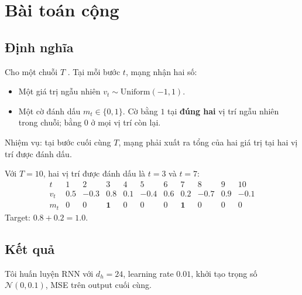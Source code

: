 %

\section{Bài toán cộng}
\label{sec:ch02-adding}

%

\subsection{Định nghĩa}

Cho một chuỗi $T$ . Tại mỗi bước $t$, mạng nhận
hai số:
\begin{itemize}
  \item Một giá trị ngẫu nhiên $v_t \sim \mathrm{Uniform}(-1, 1)$.
  \item Một cờ đánh dấu $m_t \in \{0, 1\}$. Cờ bằng $1$ tại \textbf{đúng hai}
    vị trí ngẫu nhiên trong chuỗi; bằng $0$ ở mọi vị trí còn lại.
\end{itemize}

Nhiệm vụ: tại bước cuối cùng $T$, mạng phải xuất ra tổng của hai giá trị tại
hai vị trí được đánh dấu.

\begin{example}
Với $T=10$, hai vị trí được đánh dấu là $t=3$ và $t=7$:
\[
\begin{array}{c|cccccccccc}
t      & 1 & 2 & 3    & 4 & 5 & 6 & 7    & 8 & 9 & 10 \\
\hline
v_t    & 0.5 & -0.3 & \mathbf{0.8} & 0.1 & -0.4 & 0.6 & \mathbf{0.2} & -0.7 & 0.9 & -0.1 \\
m_t    & 0 & 0 & \mathbf{1} & 0 & 0 & 0 & \mathbf{1} & 0 & 0 & 0
\end{array}
\]
Target: $0.8 + 0.2 = 1.0$.
\end{example}

\subsection{Kết quả}

Tôi huấn luyện RNN với $d_h = 24$, learning rate $0.01$, khởi tạo trọng số
$\mathcal{N}(0, 0.1)$,  MSE trên output cuối
cùng.

